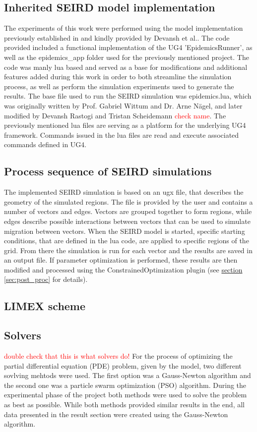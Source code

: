 \subsection{Inherited SEIRD model implementation}
The experiments of this work were  performed using the model implementation previously established in and kindly provided by
Devansh et al.\cite{devansh}. The code provided included a functional implementation of the UG4 'EpidemicsRunner', as well as
the epidemics\_app folder used for  the previously mentioned project. The code was manly lua based and served as a base
for modifications and additional features added during this work in order to both streamline the simulation process, as
well as perform the simulation experiments used to generate the results. The base file used to run the SEIRD simulation was epidemics.lua,
which was originally written by Prof. Gabriel Wittum and Dr. Arne N\"agel, and later modified by Devansh Rastogi and Tristan Scheidemann
\textcolor{red}{check name}. 
The previously mentioned lua files are serving as a platform for the underlying UG4 framework. Commands issued in the lua files
are read and execute associated commands defined in UG4. 

\subsection{Process sequence of SEIRD simulations}
The implemented SEIRD simulation is based on an ugx file, that describes the geometry of the simulated regions. The file is provided
by the user and contains a number of vectors and edges. Vectors are grouped together to form regions, while edges describe possible
interactions between vectors that can be used to simulate migration between vectors. When the SEIRD model is started, specific starting
conditions, that are defined in the lua code, are applied to specific regions of the grid. From there the simulation is run for each
vector and the results are saved in an output file. If parameter optimization is performed, these results are then modified and processed
using the ConstrainedOptimization plugin (see \hyperref[sec:post_proc]{section \ref*{sec:post_proc}} for details).


\subsection{LIMEX scheme}

\subsection{Solvers}
\textcolor{red}{double check that this is what solvers do!}
For the process of optimizing the partial differential equation (PDE) problem, given by the model, two different sovlving mehtods
were used. The first option was a Gauss-Newton algorithm and the second one was a particle swarm optimization (PSO) algorithm.
During the experimental phase of the project both methods were used to solve the problem as best as possible. While both
methods provided similar results in the end, all data presented in the result section were created using the Gauss-Newton
algorithm. 

